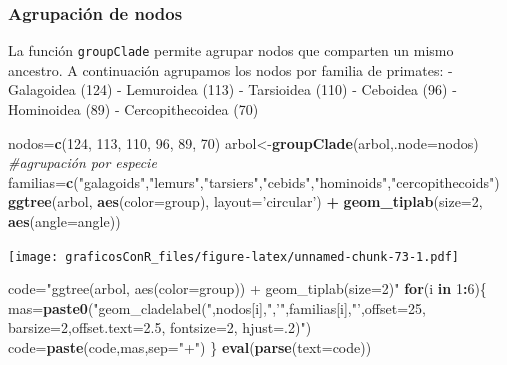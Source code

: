 \documentclass[]{article}
\newenvironment{Shaded}{\begin{snugshade}}{\end{snugshade}}
\newcommand{\CommentTok}[1]{\textcolor[rgb]{0.56,0.35,0.01}{\textit{#1}}}
\newcommand{\ControlFlowTok}[1]{\textcolor[rgb]{0.13,0.29,0.53}{\textbf{#1}}}
\newcommand{\DataTypeTok}[1]{\textcolor[rgb]{0.13,0.29,0.53}{#1}}
\newcommand{\DecValTok}[1]{\textcolor[rgb]{0.00,0.00,0.81}{#1}}
\newcommand{\KeywordTok}[1]{\textcolor[rgb]{0.13,0.29,0.53}{\textbf{#1}}}
\newcommand{\NormalTok}[1]{#1}
\newcommand{\OperatorTok}[1]{\textcolor[rgb]{0.81,0.36,0.00}{\textbf{#1}}}
\newcommand{\StringTok}[1]{\textcolor[rgb]{0.31,0.60,0.02}{#1}}
\numberwithin{ejcnt}{section}
\begin{document}
\hypertarget{agrupacion-de-nodos}{%
\subsubsection{Agrupación de nodos}\label{agrupacion-de-nodos}}

La función \texttt{groupClade} permite agrupar nodos que comparten un mismo ancestro. A continuación agrupamos los nodos por familia de primates:
- Galagoidea (124)
- Lemuroidea (113)
- Tarsioidea (110)
- Ceboidea (96)
- Hominoidea (89)
- Cercopithecoidea (70)

\begin{Shaded}
\begin{Highlighting}[]
\NormalTok{nodos=}\KeywordTok{c}\NormalTok{(}\DecValTok{124}\NormalTok{, }\DecValTok{113}\NormalTok{, }\DecValTok{110}\NormalTok{, }\DecValTok{96}\NormalTok{, }\DecValTok{89}\NormalTok{, }\DecValTok{70}\NormalTok{)}
\NormalTok{arbol<-}\KeywordTok{groupClade}\NormalTok{(arbol,}\DataTypeTok{.node=}\NormalTok{nodos) }\CommentTok{#agrupación por especie}
\NormalTok{familias=}\KeywordTok{c}\NormalTok{(}\StringTok{"galagoids"}\NormalTok{,}\StringTok{"lemurs"}\NormalTok{,}\StringTok{"tarsiers"}\NormalTok{,}\StringTok{"cebids"}\NormalTok{,}\StringTok{"hominoids"}\NormalTok{,}\StringTok{"cercopithecoids"}\NormalTok{)}
\KeywordTok{ggtree}\NormalTok{(arbol, }\KeywordTok{aes}\NormalTok{(}\DataTypeTok{color=}\NormalTok{group), }\DataTypeTok{layout=}\StringTok{'circular'}\NormalTok{) }\OperatorTok{+}\StringTok{ }
\StringTok{  }\KeywordTok{geom_tiplab}\NormalTok{(}\DataTypeTok{size=}\DecValTok{2}\NormalTok{, }\KeywordTok{aes}\NormalTok{(}\DataTypeTok{angle=}\NormalTok{angle))}
\end{Highlighting}
\end{Shaded}

\texttt{[image: graficosConR\_files/figure-latex/unnamed-chunk-73-1.pdf]}

\begin{Shaded}
\begin{Highlighting}[]
\NormalTok{code=}\StringTok{"ggtree(arbol, aes(color=group)) + geom_tiplab(size=2)"}
\ControlFlowTok{for}\NormalTok{(i }\ControlFlowTok{in} \DecValTok{1}\OperatorTok{:}\DecValTok{6}\NormalTok{)\{}
\NormalTok{  mas=}\KeywordTok{paste0}\NormalTok{(}\StringTok{"geom_cladelabel("}\NormalTok{,nodos[i],}\StringTok{",'"}\NormalTok{,familias[i],}\StringTok{"',offset=25, barsize=2,offset.text=2.5, fontsize=2, hjust=.2)"}\NormalTok{)}
\NormalTok{  code=}\KeywordTok{paste}\NormalTok{(code,mas,}\DataTypeTok{sep=}\StringTok{"+"}\NormalTok{)}
\NormalTok{  \}}
\KeywordTok{eval}\NormalTok{(}\KeywordTok{parse}\NormalTok{(}\DataTypeTok{text=}\NormalTok{code))}
\end{Highlighting}
\end{Shaded}
\end{document}
